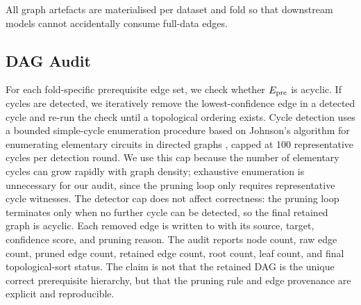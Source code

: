 All graph artefacts are materialised per dataset and fold so that
downstream models cannot accidentally consume full-data edges.
\subsection{DAG Audit}
\label{sec:dag-audit}
For each fold-specific prerequisite edge set, we check whether $E_{\text{pre}}$
is acyclic. If cycles are detected, we iteratively remove the
lowest-confidence edge in a detected cycle and re-run the check until a
topological ordering exists. Cycle detection uses a bounded simple-cycle enumeration procedure based on
Johnson's algorithm for enumerating elementary circuits in directed graphs \cite{johnson1975finding}, capped at 100 representative cycles per detection round. We use this cap because the number of elementary cycles can grow rapidly with graph density; exhaustive enumeration is unnecessary for our
audit, since the pruning loop only requires representative cycle witnesses. The detector cap does not affect
correctness: the pruning loop terminates only when no further cycle can
be detected, so the final retained graph is acyclic. Each removed edge
is written to
 with its source,
target, confidence score, and pruning reason. The audit reports node
count, raw edge count, pruned edge count, retained edge count, root
count, leaf count, and final topological-sort status. The claim is not
that the retained DAG is the unique correct prerequisite hierarchy, but
that the pruning rule and edge provenance are explicit and reproducible.
